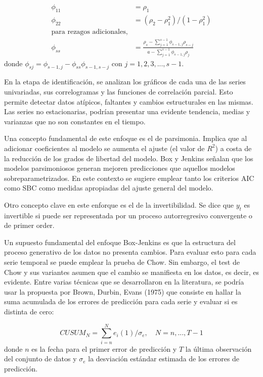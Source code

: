 \begin{align}
\label{eq: 2_35}
\phi_{11}&=\rho_1\\
\label{eq: 2_36}
\phi_{22}&=(\rho_2-\rho_1^2)/(1-\rho_1^2)\\
\nonumber
\text{para rezagos adicionales,}\\
\label{eq: 2_37}
\phi_{ss}&=\frac{\rho_s-\sum_{j=1}^{s-1}\phi_{s-1,j}\rho_{s-j}}{a-\sum_{j=1}^{s-1}\phi_{s-1,j}\rho_j}
\end{align}
donde $\phi_{sj}=\phi_{s-1,j}-\phi_{ss}\phi_{s-1,s-j}$ con $j=1,2,3,...,s-1$.

En la etapa de identificación, se analizan los gráficos de cada una de las series univariadas, sus correlogramas y las funciones de correlación parcial. Esto permite detectar datos atípicos, faltantes y cambios estructurales en las mismas. Las series no estacionarias, podrían presentar una evidente tendencia, medias y varianzas que no son constantes en el tiempo.

Una concepto fundamental de este enfoque es el de parsimonia. Implica que al adicionar coeficientes al modelo se aumenta el ajuste (el valor de $R^2$) a costa de la reducción de los grados de libertad del modelo. Box y Jenkins señalan que los modelos parsimoniosos generan mejoren predicciones que aquellos modelos sobreparametrizados. En este contexto se sugiere emplear tanto los criterios AIC como SBC como medidas apropiadas del ajuste general del modelo.

Otro concepto clave en este enforque es el de la invertibilidad. Se dice que $y_t$ es invertible si puede ser representada por un proceso autorregresivo convergente o de primer order.

Un supuesto fundamental del enfoque Box-Jenkins es que la estructura del proceso generativo de los datos no presenta cambios. Para evaluar esto para cada serie temporal se puede emplear la prueba de Chow. Sin embargo, el test de Chow y sus variantes asumen que el cambio se manifiesta en los datos, es decir, es evidente. Entre varias técnicas que se desarrollaron en la literatura, se podría usar la propuesta por Brown, Durbin, Evans (1975) que consiste en hallar la suma acumulada de los errores de predicción para cada serie y evaluar si es distinta de cero:

\begin{equation*}
CUSUM_N=\sum_{i=n}^{N}e_i(1)/\sigma_e,\quad N=n,...,T-1    
\end{equation*}
donde $n$ es la fecha para el primer error de predicción y $T$ la última observación del conjunto de datos y $\sigma_e$ la desviación estándar estimada de los errores de predicción.
